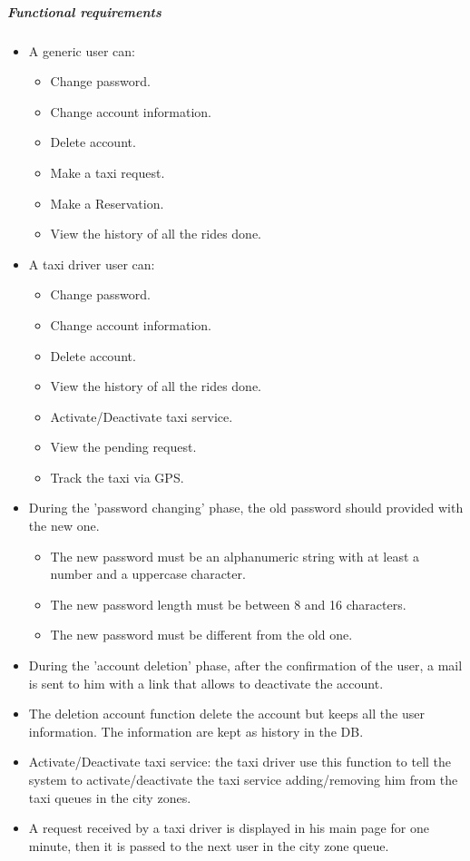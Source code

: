 	\subparagraph{Functional requirements}
	\noindent
		\begin{itemize}
			\item A generic user can:
			\begin{itemize}
				\item Change password.
				\item Change account information.
				\item Delete account.
				\item Make a taxi request.
				\item Make a Reservation.
				\item View the history of all the rides done.
			\end{itemize}
			\item A taxi driver user can:
			\begin{itemize}
				\item Change password.
				\item Change account information.
				\item Delete account.
				\item View the history of all the rides done.
				\item Activate/Deactivate taxi service.
				\item View the pending request.
				\item Track the taxi via GPS.
			\end{itemize}
			
			\item During the 'password changing' phase, the old password should provided with the new one.
			\begin{itemize}
				\item The new password must be an alphanumeric string with at least a number and a uppercase character.
				\item The new password length must be between 8 and 16 characters. 
				\item The new password must be different from the old one.
			\end{itemize}
			\item During the 'account deletion' phase, after the confirmation of the user, a mail is sent to him with a link that allows to deactivate the account.
			\item The deletion account function delete the account but keeps all the user information. The information are kept as history in the DB.
			\item Activate/Deactivate taxi service: the taxi driver use this function to tell the system to activate/deactivate the taxi service adding/removing him from the taxi queues in the city zones.
			\item A request received by a taxi driver is displayed in his main page for one minute, then it is passed to the next user in the city zone queue.
		\end{itemize}


